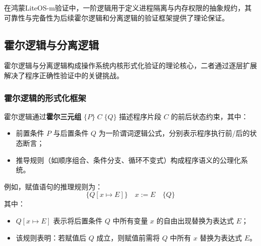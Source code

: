 在鸿蒙LiteOS-m验证中，一阶逻辑用于定义进程隔离与内存权限的抽象规约，其可靠性与完备性为后续霍尔逻辑和分离逻辑的验证框架提供了理论保证。

\subsection{霍尔逻辑与分离逻辑}
\label{subsec:hoare-separation}

霍尔逻辑与分离逻辑构成操作系统内核形式化验证的理论核心，二者通过逐层扩展解决了程序正确性验证中的关键挑战。

\subsubsection{霍尔逻辑的形式化框架}
霍尔逻辑通过\textbf{霍尔三元组} $\{P\}\;C\;\{Q\}$ 描述程序片段 $C$ 的前后状态约束，其中：
\begin{itemize}
    \item 前置条件 $P$ 与后置条件 $Q$ 为一阶谓词逻辑公式，分别表示程序执行前/后的状态断言；
    \item 推导规则（如顺序组合、条件分支、循环不变式）构成程序语义的公理化系统。
\end{itemize}

例如，赋值语句的推理规则为：
$$
    \boxed{\{ Q[x \mapsto E] \} \quad x := E \quad \{ Q \}}
$$
其中：
\begin{itemize}
    \item $Q[x \mapsto E]$ 表示将后置条件 $Q$ 中所有变量 $x$ 的自由出现替换为表达式 $E$；
    \item 该规则表明：若赋值后 $Q$ 成立，则赋值前需将 $Q$ 中所有 $x$ 替换为表达式 $E$。
\end{itemize}

